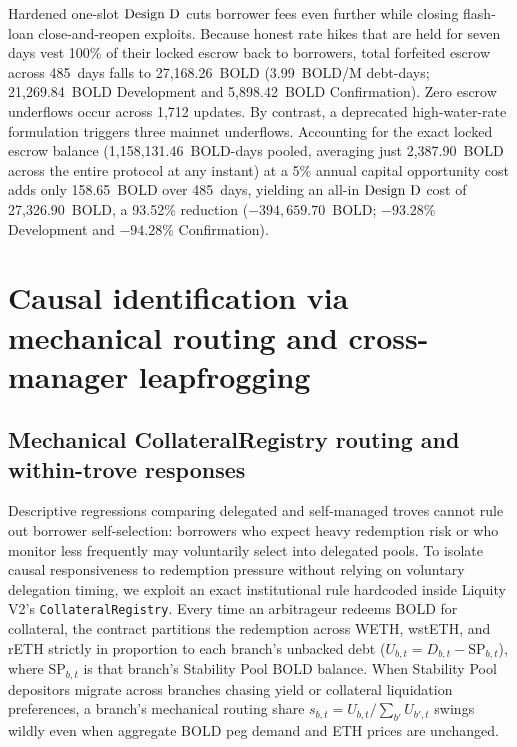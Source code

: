 Hardened one-slot $\text{Design D}$ cuts borrower fees even further while closing flash-loan close-and-reopen exploits. Because honest rate hikes that are held for seven days vest 100\% of their locked escrow back to borrowers, total forfeited escrow across 485~days falls to 27,168.26~BOLD (3.99~BOLD/M debt-days; 21,269.84~BOLD Development and 5,898.42~BOLD Confirmation). Zero escrow underflows occur across 1,712 updates. By contrast, a deprecated high-water-rate formulation triggers three mainnet underflows. Accounting for the exact locked escrow balance (1,158,131.46~BOLD-days pooled, averaging just 2,387.90~BOLD across the entire protocol at any instant) at a 5\% annual capital opportunity cost adds only 158.65~BOLD over 485~days, yielding an all-in $\text{Design D}$ cost of 27,326.90~BOLD, a 93.52\% reduction ($-394{,}659.70$~BOLD; $-93.28\%$ Development and $-94.28\%$ Confirmation).

\section{Causal identification via mechanical routing and cross-manager leapfrogging}\label{sec:causal}

\subsection{Mechanical CollateralRegistry routing and within-trove responses}\label{subsec:routing}

Descriptive regressions comparing delegated and self-managed troves cannot rule out borrower self-selection: borrowers who expect heavy redemption risk or who monitor less frequently may voluntarily select into delegated pools. To isolate causal responsiveness to redemption pressure without relying on voluntary delegation timing, we exploit an exact institutional rule hardcoded inside Liquity V2's \texttt{CollateralRegistry}. Every time an arbitrageur redeems BOLD for collateral, the contract partitions the redemption across WETH, wstETH, and rETH strictly in proportion to each branch's unbacked debt ($U_{b,t} = D_{b,t} - \text{SP}_{b,t}$), where $\text{SP}_{b,t}$ is that branch's Stability Pool BOLD balance. When Stability Pool depositors migrate across branches chasing yield or collateral liquidation preferences, a branch's mechanical routing share $s_{b,t} = U_{b,t} / \sum_{b'} U_{b',t}$ swings wildly even when aggregate BOLD peg demand and ETH prices are unchanged.

